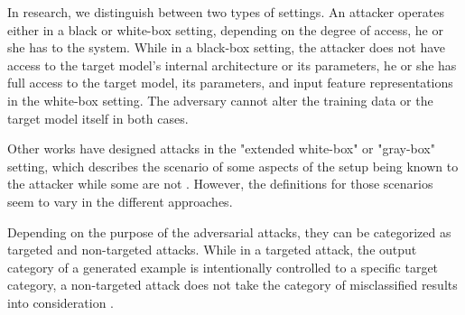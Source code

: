 In research, we distinguish between two types of settings.
An attacker operates either in a black or white-box setting, depending on the degree of access, he or she has to the system. While in a black-box setting, the attacker does not have access to the target model's internal architecture or its parameters, he or she has full access to the target model, its parameters, and input feature representations in the white-box setting. The adversary cannot alter the training data or the target model itself in both cases.

Other works have designed attacks in the "extended white-box" or "gray-box" setting, which describes the scenario of some aspects of the setup being known to the attacker while some are not \cite{vivek2018gray}. However, the definitions for those scenarios seem to vary in the different approaches.

Depending on the purpose of the adversarial attacks, they can be categorized as targeted and non-targeted attacks. While in a targeted attack, the output category of a generated example is intentionally controlled to a specific target category, a non-targeted attack does not take the category of misclassified results into consideration \cite{vijayaraghavan2019generating}.

